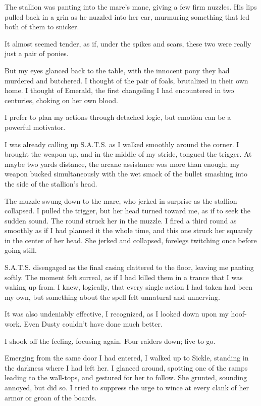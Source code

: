 The stallion was panting into the mare’s mane, giving a few firm nuzzles. His lips pulled back in a grin as he nuzzled into her ear, murmuring something that led both of them to snicker.

It almost seemed tender, as if, under the spikes and scars, these two were really just a pair of ponies.

But my eyes glanced back to the table, with the innocent pony they had murdered and butchered. I thought of the pair of foals, brutalized in their own home. I thought of Emerald, the first changeling I had encountered in two centuries, choking on her own blood.

I prefer to plan my actions through detached logic, but emotion can be a powerful motivator.

I was already calling up S.A.T.S. as I walked smoothly around the corner. I brought the weapon up, and in the middle of my stride, tongued the trigger. At maybe two yards distance, the arcane assistance was more than enough; my weapon bucked simultaneously with the wet smack of the bullet smashing into the side of the stallion’s head.

The muzzle swung down to the mare, who jerked in surprise as the stallion collapsed. I pulled the trigger, but her head turned toward me, as if to seek the sudden sound. The round struck her in the muzzle. I fired a third round as smoothly as if I had planned it the whole time, and this one struck her squarely in the center of her head. She jerked and collapsed, forelegs twitching once before going still.

S.A.T.S. disengaged as the final casing clattered to the floor, leaving me panting softly. The moment felt surreal, as if I had killed them in a trance that I was waking up from. I knew, logically, that every single action I had taken had been my own, but something about the spell felt unnatural and unnerving.

It was also undeniably effective, I recognized, as I looked down upon my hoof-work. Even Dusty couldn’t have done much better.

I shook off the feeling, focusing again. Four raiders down; five to go.

Emerging from the same door I had entered, I walked up to Sickle, standing in the darkness where I had left her. I glanced around, spotting one of the ramps leading to the wall-tops, and gestured for her to follow. She grunted, sounding annoyed, but did so. I tried to suppress the urge to wince at every clank of her armor or groan of the boards.

